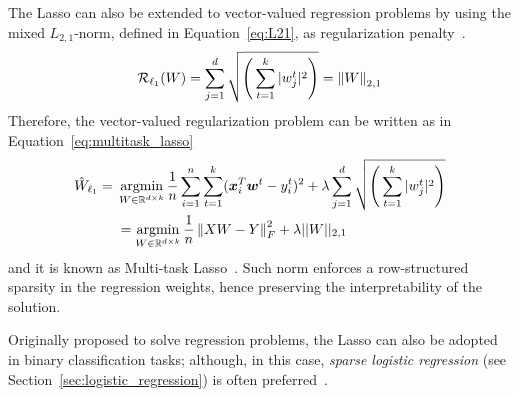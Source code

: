 			The Lasso can also be extended to vector-valued regression problems by using the mixed $L_{2,1}$-norm, defined in Equation~\eqref{eq:L21}, as regularization penalty~\cite{gramfort2012mixed}.
			\begin{equation}\label{eq:L21}
				\mathcal{R}_{\ell_1}(W)= \sum_{j=1}^d\sqrt{\Bigg(\sum_{t=1}^k |w_j^t|^2\Bigg)} = \left\lVert W\right\rVert_{2,1}
			\end{equation}
			Therefore, the vector-valued regularization problem can be written as in Equation~\eqref{eq:multitask_lasso}
			\begin{equation} \label{eq:multitask_lasso}
				\begin{aligned}
					\hat W_{\ell_1}={} & \mathop{\mathrm{argmin}}\limits_{W \in \mathbb{R}^{d \times k}} \frac{1}{n} \sum_{i=1}^n \sum_{t=1}^k (\bm{x}_i^T\bm{w}^t - y_i^t)^2 + \lambda  \sum_{j=1}^d \sqrt{\Bigg(\sum_{t=1}^k |w_j^t|^2\Bigg)} \\
					& =	\mathop{\mathrm{argmin}}\limits_{W \in \mathbb{R}^{d \times k}} \frac{1}{n} \left\lVert XW - Y\right\rVert_F^2 + \lambda ||W||_{2,1}
				\end{aligned}
			\end{equation}
			and it is known as Multi-task Lasso~\cite{lee2010adaptive}. Such norm enforces a row-structured sparsity in the regression weights, hence preserving the interpretability of the solution.

			Originally proposed to solve regression problems, the Lasso can also be adopted in binary classification tasks; although, in this case, \textit{sparse logistic regression} (see Section~\eqref{sec:logistic_regression}) is often preferred~\cite{tong2009genome}.

